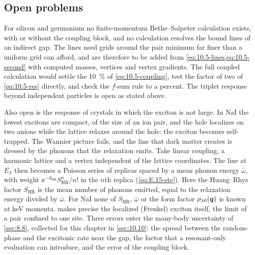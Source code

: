 \subsection{Open problems}\label{sec:10.5-open}

For silicon and germanium no finite-momentum Bethe--Salpeter calculation exists, with or without the coupling block, and no calculation resolves the bound lines of an indirect gap. The lines need grids around the pair minimum far finer than a uniform grid can afford, and are therefore to be added from \cref{eq:10.5-lines,eq:10.5-second} with computed masses, vertices and vertex gradients. The full coupled calculation would settle the \SI{10}{\percent} of \cref{eq:10.5-coupling}, test the factor of two of \cref{eq:10.5-res} directly, and check the $f$-sum rule to a percent. The triplet response beyond independent particles is open as stated above.

Also open is the response of crystals in which the exciton is not large. In NaI the lowest excitons are compact, of the size of an ion pair, and the hole localizes on two anions while the lattice relaxes around the hole: the exciton becomes self-trapped. The Wannier picture fails, and the line that dark matter creates is dressed by the phonons that the relaxation emits. Take linear coupling, a harmonic lattice and a vertex independent of the lattice coordinates. The line at $E_\lambda$ then becomes a Poisson series of replicas spaced by a mean phonon energy $\bar\omega$, with weight $\ee^{-S_{\mathrm{HR}}}S_{\mathrm{HR}}^n/n!$ in the $n$th replica (\cref{eq:E.15-ste}). Here the Huang--Rhys factor $S_{\mathrm{HR}}$ is the mean number of phonons emitted, equal to the relaxation energy divided by $\bar\omega$. For NaI none of $S_{\mathrm{HR}}$, $\bar\omega$ or the form factor $\rho_{\lambda0}(\bm{q})$ is known at keV momenta.  makes precise the localized (Frenkel) exciton itself, the limit of a pair confined to one site. Three errors enter the many-body uncertainty of \cref{sec:8.8}, collected for this chapter in \cref{sec:10.10}: the spread between the random-phase and the excitonic rate near the gap, the factor that a resonant-only evaluation can introduce, and the error of the coupling block.
